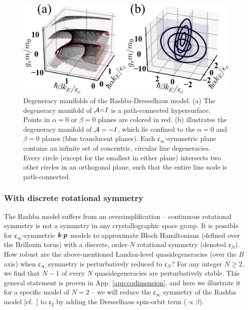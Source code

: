 \documentclass[aps, prb, showpacs, twocolumn, notitlepage, superscriptaddress]{revtex4-1}
\begin{document}
\begin{figure}
\includegraphics[width=1.0\columnwidth]{dgn.png}
\caption{Degeneracy manifolds of the Rashba-Dresselhaus model. (a) The degeneracy manifold of ${\cal A}{=}I$ is a path-connected hypersurface. Points in $\alpha=0$ or $\beta=0$ planes are colored in red. (b) illustrates the degeneracy manifold of ${\cal A}=-I$, which lie confined to  the $\alpha{=}0$ and $\beta{=}0$ planes (blue translucent planes). Each $\mathfrak{c}_{\infty}$-symmetric plane contains an infinite set of concentric, circular line degeneracies. Every circle (except for the smallest in either plane)  intersects two other circles in an orthogonal plane, such that the entire line node is path-connected. \label{fig:dgn}}
\end{figure}

\subsubsection{With discrete rotational symmetry}\label{sec:disrot}


The Rashba model suffers from an oversimplification -- continuous rotational symmetry is not a symmetry in any crystallographic space group. It is possible for $\mathfrak{c}_{\infty}$-symmetric $\boldsymbol{k}{\cdot}\boldsymbol{p}$ models to approximate Bloch Hamiltonians (defined over the Brillouin torus) with a discrete, order-$N$ rotational symmetry (denoted $\mathfrak{c}_N$). How robust are the above-mentioned Landau-level quasidegeneracies  (over the $B$ axis) when $\mathfrak{c}_{\infty}$ symmetry is perturbatively reduced to $\mathfrak{c}_N$? For any  integer $N{\geq}2$, we find that $N{-}1$ of every $N$ quasidegeneracies  are perturbatively stable. This general statement is proven in App. \ref{app:codimension}, and here we illustrate it for a specific model of $N{=}2$ -- we will reduce the $\mathfrak{c}_{\infty}$ symmetry of the Rashba model [cf.\ ] to  $\mathfrak{c}_2$  by adding the Dresselhaus spin-orbit term (${\propto} \beta$).  
\end{document}
